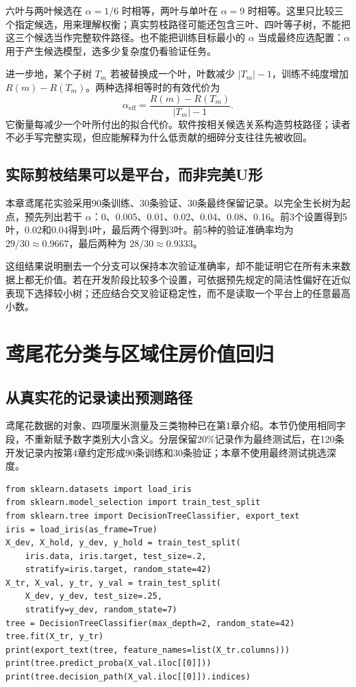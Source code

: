 六叶与两叶候选在 $\alpha=1/6$ 时相等，两叶与单叶在 $\alpha=9$ 时相等。这里只比较三个指定候选，用来理解权衡；真实剪枝路径可能还包含三叶、四叶等子树，不能把这三个候选当作完整软件路径。也不能把训练目标最小的 $\alpha$ 当成最终应选配置：$\alpha$用于产生候选模型，选多少复杂度仍看验证任务。

进一步地，某个子树 $T_m$ 若被替换成一个叶，叶数减少 $|T_m|-1$，训练不纯度增加 $R(m)-R(T_m)$。两种选择相等时的有效代价为
\[
\alpha_{\mathrm{eff}}=\frac{R(m)-R(T_m)}{|T_m|-1}.
\]
它衡量每减少一个叶所付出的拟合代价。软件按相关候选关系构造剪枝路径；读者不必手写完整实现，但应能解释为什么低贡献的细碎分支往往先被收回。

\subsection{实际剪枝结果可以是平台，而非完美U形}
本章鸢尾花实验采用90条训练、30条验证、30条最终保留记录。以完全生长树为起点，预先列出若干 $\alpha$：0、0.005、0.01、0.02、0.04、0.08、0.16。前3个设置得到5叶，0.02和0.04得到4叶，最后两个得到3叶。前5种的验证准确率均为 $29/30\approx0.9667$，最后两种为 $28/30\approx0.9333$。


这组结果说明删去一个分支可以保持本次验证准确率，却不能证明它在所有未来数据上都无价值。若在开发阶段比较多个设置，可依据预先规定的简洁性偏好在近似表现下选择较小树；还应结合交叉验证稳定性，而不是读取一个平台上的任意最高小数。

\section{鸢尾花分类与区域住房价值回归}
\subsection{从真实花的记录读出预测路径}
鸢尾花数据的对象、四项厘米测量及三类物种已在第1章介绍。本节仍使用相同字段，不重新赋予数字类别大小含义。分层保留20\%记录作为最终测试后，在120条开发记录内按第4章约定形成90条训练和30条验证；本章不使用最终测试挑选深度。

\begin{lstlisting}[caption={与本章结果一致的浅树训练与路径读取}]
from sklearn.datasets import load_iris
from sklearn.model_selection import train_test_split
from sklearn.tree import DecisionTreeClassifier, export_text
iris = load_iris(as_frame=True)
X_dev, X_hold, y_dev, y_hold = train_test_split(
    iris.data, iris.target, test_size=.2,
    stratify=iris.target, random_state=42)
X_tr, X_val, y_tr, y_val = train_test_split(
    X_dev, y_dev, test_size=.25,
    stratify=y_dev, random_state=7)
tree = DecisionTreeClassifier(max_depth=2, random_state=42)
tree.fit(X_tr, y_tr)
print(export_text(tree, feature_names=list(X_tr.columns)))
print(tree.predict_proba(X_val.iloc[[0]]))
print(tree.decision_path(X_val.iloc[[0]]).indices)
\end{lstlisting}

